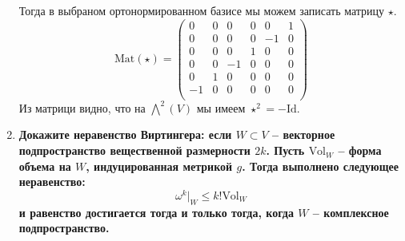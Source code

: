 \documentclass{article}
\begin{document}
\begin{enumerate}
        Тогда в выбраном ортонормированном базисе мы можем записать матрицу $\star$.
        \[\text{Mat}(\star)=\left(\begin{array}{cccccc}
            0&0& 0&0& 0&1\\
            0&0& 0&0&-1&0\\
            0&0& 0&1& 0&0\\
            0&0&-1&0& 0&0\\
            0&1& 0&0& 0&0\\
           -1&0& 0&0& 0&0\\
        \end{array}\right)\]
        Из матрици видно, что на $\bigwedge^2(V)$ мы имеем $\star^2=-\text{Id}$.

    \item \textbf{Докажите неравенство Виртингера: если $W\subset V$ – векторное
        подпространство вещественной размерности $2k$. Пусть $\text{Vol}_W$ –
        форма объема на $W$, индуцированная метрикой $g$. Тогда выполнено
        следующее неравенство:
        \[ω^k|_W\leq k!\text{Vol}_W\]
        и равенство достигается тогда и только тогда, когда $W$ – комплексное
        подпространство.}
\end{enumerate}
\end{document}

